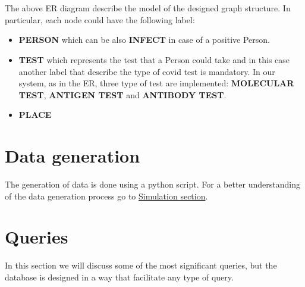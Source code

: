 \documentclass{article}
\begin{document}
		\\
		\\
		The above ER diagram describe the model of the designed graph structure. In particular, each node could have the following label:
		\begin{itemize}
		    \item \textbf{PERSON} which can be also \textbf{INFECT} in case of a positive Person. 
		    \item \textbf{TEST} which represents the test that a Person could take and in this case another label that describe the type of covid test is mandatory. In our system, as in the ER, three type of test are implemented: \textbf{MOLECULAR TEST}, \textbf{ANTIGEN TEST} and \textbf{ANTIBODY TEST}.
		    \item \textbf{PLACE}
		\end{itemize}
		
		\section{Data generation}
		The generation of data is done using a python script. For a better understanding of the data generation process go to \hyperref[sim]{Simulation section}.
		
		\section{Queries}
		In this section we will discuss some of the most significant queries, but the database is designed in a way that facilitate any type of query.
\end{document}
